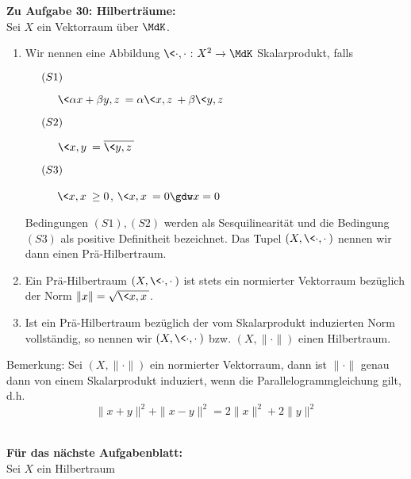 \textbf{Zu Aufgabe 30: Hilberträume:} \\
Sei $X$ ein Vektorraum über $\MdK$.
\begin{enumerate}
	\item Wir nennen eine Abbildung $\< \cdot , \cdot \> \colon X^{2} \rightarrow \MdK$
		Skalarprodukt, falls
 		\begin{description}
 			\item[$\hspace{0.5cm} (S1) \hspace{0.1cm} $] $\< \alpha x + \beta y , z \> = \alpha \<  x , z \> + \beta \< y , z \>$
 			\item[$\hspace{0.5cm} (S2) \hspace{0.1cm} $] $\< x , y \> = \overline{\< y , z \>}$
 			\item[$\hspace{0.5cm} (S3) \hspace{0.1cm} $] $\< x , x \> \geq 0$, $\< x , x \> = 0 \gdw x = 0$
 		\end{description}
 		Bedingungen $(S1), (S2)$ werden als Sesquilinearität und die Bedingung $(S3)$ als positive Definitheit bezeichnet. Das Tupel $(X , \< \cdot , \cdot \>)$ nennen wir dann einen Prä-Hilbertraum.
 	\item Ein Prä-Hilbertraum $(X , \< \cdot , \cdot \>)$ ist stets ein normierter Vektorraum bezüglich der Norm $\| x \| = \sqrt{\< x , x \>}$.
 	\item Ist ein Prä-Hilbertraum bezüglich der vom Skalarprodukt induzierten Norm vollständig, so nennen wir $(X , \< \cdot , \cdot \>)$ bzw. $(X , \| \cdot \|)$ einen Hilbertraum.
\end{enumerate}

Bemerkung: Sei $(X, \| \cdot \|)$ ein normierter Vektorraum, dann ist $\| \cdot \|$ genau dann von einem Skalarprodukt induziert, wenn die Parallelogrammgleichung gilt, d.h.
	\[ \| x + y \|^{2} + \| x - y \|^{2} = 2 \| x \|^{2} + 2 \| y \|^{2} \]
~ \newline

\textbf{Für das nächste Aufgabenblatt:} \\
Sei $X$ ein Hilbertraum

